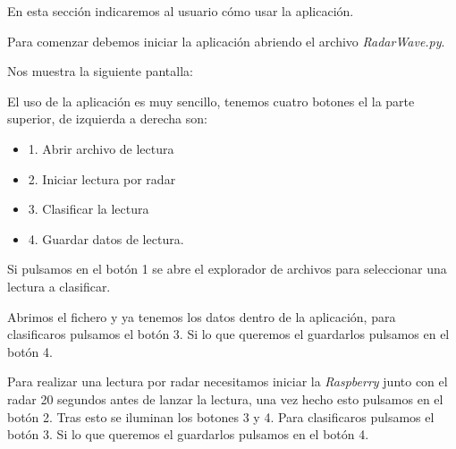 En esta sección indicaremos al usuario cómo usar la aplicación.

Para comenzar debemos iniciar la aplicación abriendo el archivo \textit{RadarWave.py}.

Nos muestra la siguiente pantalla:


El uso de la aplicación es muy sencillo, tenemos cuatro botones el la parte superior, de izquierda a derecha son:
\begin{itemize}
\item 1. Abrir archivo de lectura
\item 2. Iniciar lectura por radar
\item 3. Clasificar la lectura
\item 4. Guardar datos de lectura.
\end{itemize}

Si pulsamos en el botón 1 se abre el explorador de archivos para seleccionar una lectura a clasificar.

Abrimos el fichero y ya tenemos los datos dentro de la aplicación, para clasificaros pulsamos el botón 3. Si lo que queremos el guardarlos pulsamos en el botón 4.

Para realizar una lectura por radar necesitamos iniciar la \textit{Raspberry} junto con el radar 20 segundos antes de lanzar la lectura, una vez hecho esto pulsamos en el botón 2. Tras esto se iluminan los botones 3 y 4. Para clasificaros pulsamos el botón 3. Si lo que queremos el guardarlos pulsamos en el botón 4.


